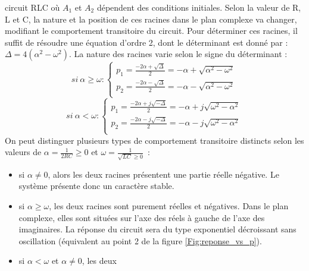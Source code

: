 \begin{exemple}{circuit RLC}
          où $A_{1}$ et $A_{2}$ dépendent des conditions
          initiales. Selon la valeur de R, L et C, la nature et la
          position de ces racines dans le plan complexe va changer, modifiant
          le comportement transitoire du circuit. Pour déterminer ces
          racines, il suffit de résoudre une équation d'ordre 2, dont le
          déterminant est donné par :
          $\Delta = 4(\alpha^{2}-\omega^{2})$. La nature des racines
          varie selon le signe du déterminant :
          \begin{equation}
            si~\alpha \geq \omega : \left \{
              \begin{array}{l}
                p_{1}=\frac{-2\alpha +\sqrt{\Delta}}{2}=-\alpha+\sqrt{\alpha^{2}-\omega^{2}} \\
                p_{2}=\frac{-2\alpha -\sqrt{\Delta}}{2}=-\alpha-\sqrt{\alpha^{2}-\omega^{2}} \\
              \end{array}
            \right.
          \end{equation}
          \begin{equation}
            si~\alpha < \omega : \left \{
              \begin{array}{l}
                p_{1}=\frac{-2\alpha +j\sqrt{-\Delta}}{2}=-\alpha+j\sqrt{\omega^{2}-\alpha^{2}} \\
                p_{2}=\frac{-2\alpha -j\sqrt{-\Delta}}{2}=-\alpha-j\sqrt{\omega^{2}-\alpha^{2}} \\
              \end{array}
          \right.
	\end{equation}
	On peut distinguer plusieurs types de comportement transitoire
        distincts selon les valeurs de $\alpha=\frac{1}{2RC}\geq 0$ et $\omega=\frac{1}{\sqrt{LC}\geq 0}$~:
	\begin{itemize}
        \item si $\alpha \neq 0$, alors les deux racines présentent
          une partie réelle négative. Le système présente donc un
          caractère stable.
        \item si $\alpha \geq \omega$, les deux racines sont purement
          réelles et négatives. Dans le plan complexe, elles sont situées sur
          l'axe des réels à gauche de l'axe des imaginaires. La
          réponse du circuit sera du type exponentiel décroissant sans
          oscillation (équivalent au point 2 de la figure
          \ref{Fig:reponse_vs_p}).
        \item si $\alpha < \omega$ et $\alpha \neq 0$, les deux

\end{itemize}
\end{exemple}
